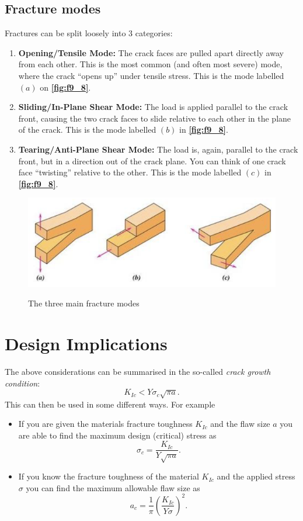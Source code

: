 \subsection{Fracture modes}
Fractures can be split loosely into 3 categories:
\begin{enumerate}
  \item \textbf{Opening/Tensile Mode:} The crack faces are pulled apart directly away from each other. This is the most common (and often most severe) mode, where the crack ``opens up'' under tensile stress. This is the mode labelled $(a)$ on \textbf{\autoref{fig:f9_8}}.
  \item \textbf{Sliding/In-Plane Shear Mode:} The load is applied parallel to the crack front, causing the two crack faces to slide relative to each other in the plane of the crack. This is the mode labelled $(b)$ in \textbf{\autoref{fig:f9_8}}.
  \item \textbf{Tearing/Anti-Plane Shear Mode:} The load is, again, parallel to the crack front, but in a direction out of the crack plane. You can think of one crack face ``twisting'' relative to the other. This is the mode labelled $(c)$ in \textbf{\autoref{fig:f9_8}}.
\end{enumerate}
\begin{figure} [ht]
  \centering
  \caption{The three main fracture modes}
  \includegraphics[width=0.5\linewidth]{./figures/f9_8.png}
  \label{fig:f9_8}
\end{figure}

\section{Design Implications}
The above considerations can be summarised in the so-called \textit{crack growth condition}:
\[ 
K_{Ic} < Y \sigma_c \sqrt{\pi a}
.\]
This can then be used in some different ways. For example
\begin{itemize}
  \item If you are given the materials fracture toughness $K_{Ic}$ and the flaw size $a$ you are able to find the maximum design (critical) stress as
    \[ 
    \sigma_c = \frac{K_{Ic}}{Y \sqrt{\pi a}}
    .\]
  \item If you know the fracture toughness of the material $K_{Ic}$ and the applied stress $\sigma$ you can find the maximum allowable flaw size as
    \[ 
    a_c = \frac{1}{\pi} \left( \frac{K_{Ic}}{Y \sigma} \right)^2
    .\]
\end{itemize}
